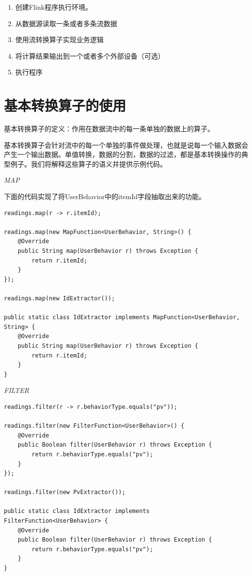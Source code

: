 \documentclass[cn,11pt,chinese]{elegantbook}
\begin{document}
\begin{enumerate}
    \item 创建Flink程序执行环境。
    \item 从数据源读取一条或者多条流数据
    \item 使用流转换算子实现业务逻辑
    \item 将计算结果输出到一个或者多个外部设备（可选）
    \item 执行程序
\end{enumerate}

\section{基本转换算子的使用}

基本转换算子的定义：作用在数据流中的每一条单独的数据上的算子。

基本转换算子会针对流中的每一个单独的事件做处理，也就是说每一个输入数据会产生一个输出数据。单值转换，数据的分割，数据的过滤，都是基本转换操作的典型例子。我们将解释这些算子的语义并提供示例代码。

\textit{MAP}

下面的代码实现了将UserBehavior中的itemId字段抽取出来的功能。

\begin{verbatim}
readings.map(r -> r.itemId);

readings.map(new MapFunction<UserBehavior, String>() {
    @Override
    public String map(UserBehavior r) throws Exception {
        return r.itemId;
    }
});

readings.map(new IdExtractor());
    
public static class IdExtractor implements MapFunction<UserBehavior, String> {
    @Override
    public String map(UserBehavior r) throws Exception {
        return r.itemId;
    }
}
\end{verbatim}

\textit{FILTER}

\begin{verbatim}
readings.filter(r -> r.behaviorType.equals("pv"));
    
readings.filter(new FilterFunction<UserBehavior>() {
    @Override
    public Boolean filter(UserBehavior r) throws Exception {
        return r.behaviorType.equals("pv");
    }
});
    
readings.filter(new PvExtractor());
    
public static class IdExtractor implements FilterFunction<UserBehavior> {
    @Override
    public Boolean filter(UserBehavior r) throws Exception {
        return r.behaviorType.equals("pv");
    }
}
\end{verbatim}
\end{document}

